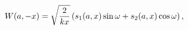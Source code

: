 \[\mathop{W\/}\nolimits\!\left(a,-x\right)=\sqrt{\frac{2}{kx}}\left(s_{1}(a,x)%
\mathop{\sin\/}\nolimits\omega+s_{2}(a,x)\mathop{\cos\/}\nolimits\omega\right),\]